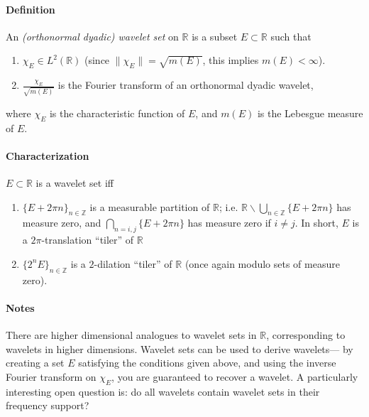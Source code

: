 \documentclass[12pt]{article}
\begin{document}

\paragraph{Definition}
An \emph{(orthonormal dyadic) wavelet set} on ${\mathbb R}$ is a subset $E \subset {\mathbb R}$ such that
\begin{enumerate}
\item $\chi_E \in L^2({\mathbb R})$ (since $\|\chi_E\| = \sqrt{m(E)}$, this implies $m(E) < \infty$).
\item $\frac{\chi_E}{\sqrt{m(E)}}$ is the Fourier transform of an orthonormal dyadic wavelet,
\end{enumerate}
where $\chi_E$ is the characteristic function of $E$, and $m(E)$ is the Lebesgue measure of $E$.

\paragraph{Characterization}
$E \subset {\mathbb R}$ is a wavelet set iff
\begin{enumerate}
\item $\{E + 2\pi n\}_{n\in {\mathbb Z}}$ is a measurable partition of $\mathbb R$; i.e. ${\mathbb R}\backslash \bigcup_{n\in \mathbb Z} \{ E + 2\pi n\}$ has measure zero, and $\bigcap_{n=i,j} \{E+2\pi n\}$ has measure zero if $i\neq j$. In short, $E$ is a $2\pi$-translation ``tiler'' of $\mathbb R$
\item $\{2^n E\}_{n\in \mathbb Z}$ is a $2$-dilation ``tiler'' of $\mathbb R$ (once again modulo sets of measure zero).
\end{enumerate}

\paragraph{Notes}
There are higher dimensional analogues to wavelet sets in $\mathbb R$, corresponding to wavelets in higher dimensions. Wavelet sets can be used to derive wavelets--- by creating a set $E$ satisfying the conditions given above, and using the inverse Fourier transform on $\chi_E$, you are guaranteed to recover a wavelet. A particularly interesting open question is: do all wavelets contain wavelet sets in their frequency support?
\end{document}
